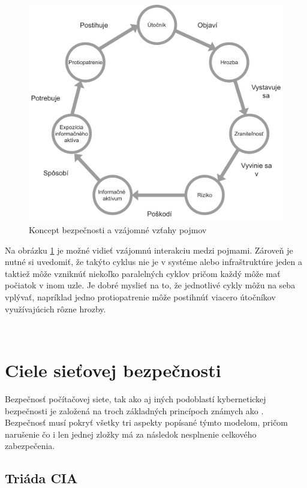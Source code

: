 	\begin{figure}[!h]
	\begin{center}
		\includegraphics[scale=0.5]{obrazky/sec_cycle.pdf}
	\end{center}
	\caption[Koncept bezpečnosti a vzájomné vzťahy pojmov]{Koncept bezpečnosti a vzájomné vzťahy pojmov\cite{McMillan2018}}
	\label{sec-cycle}
	\end{figure}

Na obrázku \ref{sec-cycle} je možné vidieť vzájomnú interakciu medzi pojmami. Zároveň je nutné si uvedomiť, že takýto cyklus nie je v systéme alebo infraštruktúre jeden a taktiež môže vzniknúť niekoľko paralelných cyklov pričom každý môže mať počiatok v inom uzle. Je dobré myslieť na to, že jednotlivé cykly môžu na seba vplývať, napríklad jedno protiopatrenie môže postihnúť viacero útočníkov využívajúcich rôzne hrozby. 

\


\section{Ciele sieťovej bezpečnosti}
Bezpečnosť počítačovej siete, tak ako aj iných podoblastí kybernetickej bezpečnosti je založená na troch základných princípoch známych ako . Bezpečnosť musí pokryť všetky tri aspekty popísané týmto modelom, pričom narušenie čo i len jednej zložky má za následok nesplnenie celkového zabezpečenia\cite{Vyncke2008}. 

\subsection{Triáda CIA}

